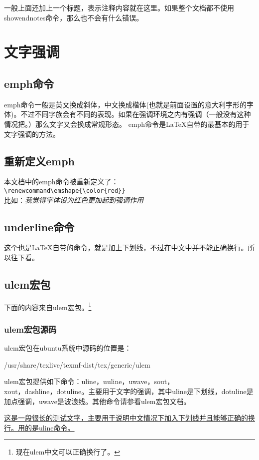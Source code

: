 \documentclass[11pt,oneside]{book}
\begin{document}
  一般上面还加上一个标题，表示注释内容就在这里。如果整个文档都不使用showendnotes命令，那么也不会有什么错误。


  \chapter{文字强调}
  \section{emph命令}
  emph命令一般是英文换成斜体，中文换成楷体(也就是前面设置的意大利字形的字体)。不过不同字族会有不同的表现。如果在强调环境之内有强调（一般没有这种情况把。）那么文字又会换成常规形态。
  emph命令是\LaTeX 自带的最基本的用于文字强调的方法。


  \section{重新定义emph}
  \label{sec:emph}
  本文档中的emph命令被重新定义了：\\
  \verb+\renewcommand\emshape{\color{red}}+\\
  比如：\emph{我觉得字体设为红色更加起到强调作用}

  \section{underline命令}
  这个也是\LaTeX 自带的命令，就是加上下划线，不过在中文中并不能正确换行。所以往下看。

  \section{ulem宏包}
  下面的内容来自ulem宏包。\footnote{现在ulem中文可以正确换行了。}

  \subsection{ulem宏包源码}
  ulem宏包在ubuntu系统中源码的位置是：
  \begin{tcbcode}[tex]
    /usr/share/texlive/texmf-dist/tex/generic/ulem
  \end{tcbcode}

  ulem宏包提供如下命令：uline，uuline，uwave，sout，\\ xout，dashline，dotuline。主要用于文字的强调，其中uline是下划线，dotuline是加点强调，uwave是波浪线。其他命令请参看ulem宏包文档。

  \uline{这是一段很长的测试文字，主要用于说明中文情况下加入下划线并且能够正确的换行。用的是uline命令。}
\end{document}
